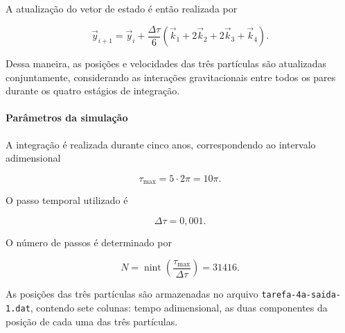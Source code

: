 \documentclass[12pt,a4paper]{article}
\begin{document}
A atualização do vetor de estado é então realizada por

\begin{equation}
    \vec{y}_{i+1}
    =
    \vec{y}_i+
    \frac{\Delta\tau}{6}
    \left(
    \vec{k}_1+2\vec{k}_2+2\vec{k}_3+\vec{k}_4
    \right).
\end{equation}

Dessa maneira, as posições e velocidades das três partículas são atualizadas conjuntamente, considerando as interações gravitacionais entre todos os pares durante os quatro estágios de integração.

\paragraph{Parâmetros da simulação}

A integração é realizada durante cinco anos, correspondendo ao intervalo adimensional

\begin{equation}
    \tau_{\max}=5\cdot2\pi=10\pi.
\end{equation}

O passo temporal utilizado é

\begin{equation}
    \Delta\tau=0,001.
\end{equation}

O número de passos é determinado por

\begin{equation}
    N=\operatorname{nint}
    \left(
    \frac{\tau_{\max}}{\Delta\tau}
    \right)
    =31416.
\end{equation}

As posições das três partículas são armazenadas no arquivo \texttt{tarefa-4a-saida-1.dat}, contendo sete colunas: tempo adimensional, as duas componentes da posição de cada uma das três partículas.
\end{document}
